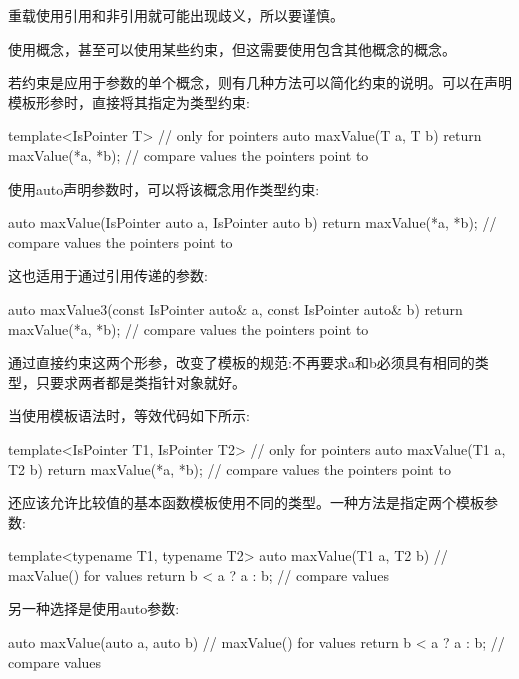 重载使用引用和非引用就可能出现歧义，所以要谨慎。

使用概念，甚至可以使用某些约束，但这需要使用包含其他概念的概念。


若约束是应用于参数的单个概念，则有几种方法可以简化约束的说明。可以在声明模板形参时，直接将其指定为类型约束:

\begin{cpp}
template<IsPointer T> // only for pointers
auto maxValue(T a, T b)
{
	return maxValue(*a, *b); // compare values the pointers point to
}
\end{cpp}

使用auto声明参数时，可以将该概念用作类型约束:

\begin{cpp}
auto maxValue(IsPointer auto a, IsPointer auto b)
{
	return maxValue(*a, *b); // compare values the pointers point to
}
\end{cpp}

这也适用于通过引用传递的参数:

\begin{cpp}
auto maxValue3(const IsPointer auto& a, const IsPointer auto& b)
{
	return maxValue(*a, *b); // compare values the pointers point to
}
\end{cpp}

通过直接约束这两个形参，改变了模板的规范:不再要求a和b必须具有相同的类型，只要求两者都是类指针对象就好。

当使用模板语法时，等效代码如下所示:

\begin{cpp}
template<IsPointer T1, IsPointer T2> // only for pointers
auto maxValue(T1 a, T2 b)
{
	return maxValue(*a, *b); // compare values the pointers point to
}
\end{cpp}

还应该允许比较值的基本函数模板使用不同的类型。一种方法是指定两个模板参数:

\begin{cpp}
template<typename T1, typename T2>
auto maxValue(T1 a, T2 b) // maxValue() for values
{
	return b < a ? a : b; // compare values
}
\end{cpp}

另一种选择是使用auto参数:

\begin{cpp}
auto maxValue(auto a, auto b) // maxValue() for values
{
	return b < a ? a : b; // compare values
}
\end{cpp}

